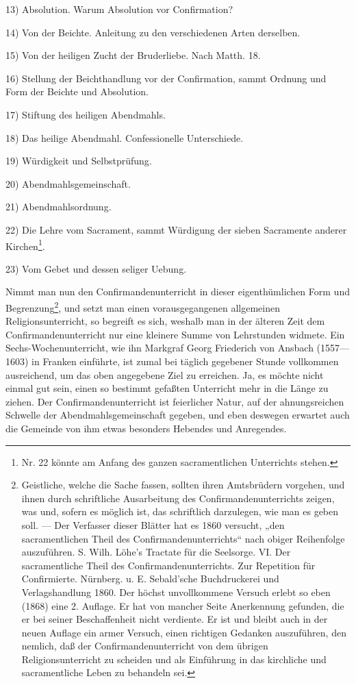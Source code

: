 13) Absolution. Warum Absolution vor Confirmation?

14) Von der Beichte. Anleitung zu den verschiedenen Arten derselben.

15) Von der heiligen Zucht der Bruderliebe. Nach Matth. 18.

16) Stellung der Beichthandlung vor der Confirmation, sammt Ordnung und Form der Beichte und Absolution.

17) Stiftung des heiligen Abendmahls.

18) Das heilige Abendmahl. Confessionelle Unterschiede.

19) Würdigkeit und Selbstprüfung.

20) Abendmahlsgemeinschaft.

21) Abendmahlsordnung.

22) Die Lehre vom Sacrament, sammt Würdigung der sieben Sacramente anderer Kirchen\footnote{Nr. 22 könnte am Anfang des ganzen sacramentlichen Unterrichts stehen.}.

23) Vom Gebet und dessen seliger Uebung.

Nimmt man nun den Confirmandenunterricht in dieser eigenthümlichen Form und Begrenzung\footnote{Geistliche, welche die Sache fassen, sollten ihren Amtsbrüdern vorgehen, und ihnen durch schriftliche Ausarbeitung des Confirmandenunterrichts zeigen, was und, sofern es möglich ist, das schriftlich darzulegen, wie man es geben soll. — Der Verfasser dieser Blätter hat es 1860 versucht, „den sacramentlichen Theil des Confirmandenunterrichts“ nach obiger Reihenfolge auszuführen. S. Wilh. Löhe’s Tractate für die Seelsorge. VI. Der sacramentliche Theil des Confirmandenunterrichts. Zur Repetition für Confirmierte. Nürnberg. u. E. Sebald’sche Buchdruckerei und Verlagshandlung 1860. Der höchst unvollkommene Versuch erlebt so eben (1868) eine 2. Auflage. Er hat von mancher Seite Anerkennung gefunden, die er bei seiner Beschaffenheit nicht verdiente. Er ist und bleibt auch in der neuen Auflage ein armer Versuch, einen richtigen Gedanken auszuführen, den nemlich, daß der Confirmandenunterricht von dem übrigen Religionsunterricht zu scheiden und als Einführung in das kirchliche und sacramentliche Leben zu behandeln sei.}, und setzt man einen vorausgegangenen allgemeinen Religionsunterricht, so begreift es sich, weshalb man in der älteren Zeit dem Confirmandenunterricht nur eine kleinere Summe von Lehrstunden widmete. Ein Sechs-Wochenunterricht, wie ihn Markgraf Georg Friederich von Ansbach (1557—1603) in Franken einführte, ist zumal bei täglich gegebener Stunde vollkommen ausreichend, um das oben angegebene Ziel zu erreichen. Ja, es möchte nicht einmal gut sein, einen so bestimmt gefaßten Unterricht mehr in die Länge zu ziehen. Der Confirmandenunterricht ist feierlicher Natur, auf der ahnungsreichen Schwelle der Abendmahlsgemeinschaft gegeben, und eben deswegen erwartet auch die Gemeinde von ihm etwas besonders Hebendes und Anregendes.

